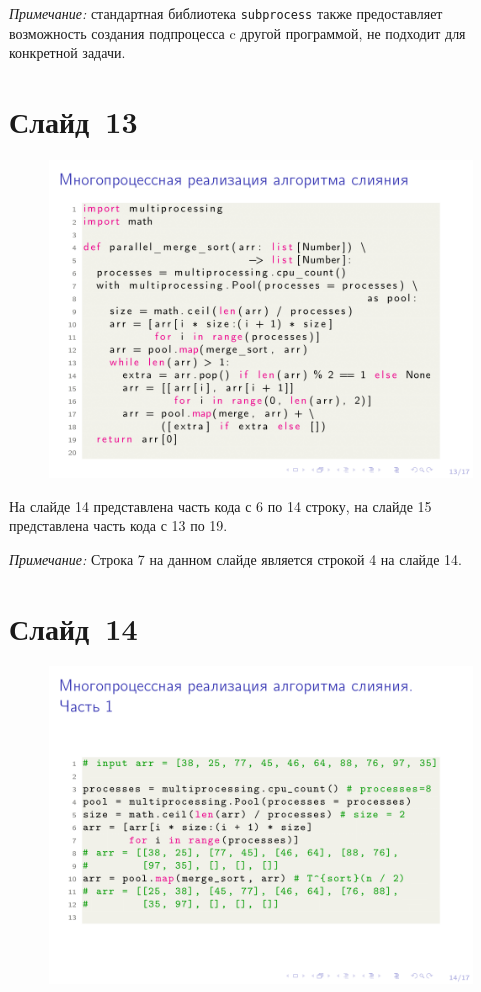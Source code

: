 \documentclass[aps,pre,reprint]{revtex4-2}
\begin{document}
	\textit{Примечание:} стандартная библиотека \verb*|subprocess| также предоставляет возможность создания подпроцесса c другой программой, не подходит для конкретной задачи.

	\section{Слайд~13}
	\begin{figure}[H]
		\includegraphics[scale=.7]{presentation-13.png}
	\end{figure}
	
	На слайде 14 представлена часть кода с 6 по 14 строку, на слайде 15 представлена часть кода с 13 по 19.
	
	\textit{Примечание:} Строка 7 на данном слайде является строкой 4 на слайде 14.
	
	\section{Слайд~14}
	\begin{figure}[H]
		\includegraphics[scale=.7]{presentation-14.png}
	\end{figure}
	
\end{document}

